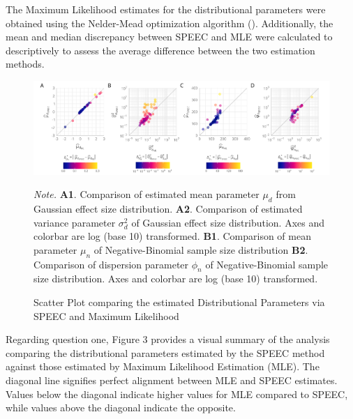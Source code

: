 \documentclass[
  12pt,
]{scrartcl}
\begin{document}
The Maximum Likelihood estimates for the distributional parameters were
obtained using the Nelder-Mead optimization algorithm
().
Additionally, the mean and median discrepancy between SPEEC and MLE were
calculated to descriptively to assess the average difference between the
two estimation methods.

\begin{figure}[H]
\caption{Scatter Plot comparing the estimated Distributional Parameters via SPEEC and Maximum Likelihood\label{fig:ml-speec-comparison}}

\begin{center}
\includegraphics[width=1\textwidth,height=\textheight]{../figures/method_comparison.png}
\end{center}

\begingroup
\scriptsize
\textit{Note.} \textbf{A1}. Comparison of estimated mean parameter $\mu_d$ from Gaussian effect size distribution. \textbf{A2}. Comparison of estimated variance parameter $\sigma_d^2$ of Gaussian effect size distribution. Axes and colorbar are log (base 10) transformed. \textbf{B1}. Comparison of mean parameter $\mu_n$ of Negative-Binomial sample size distribution \textbf{B2}. Comparison of dispersion parameter $\phi_n$ of Negative-Binomial sample size distribution. Axes and colorbar are log (base 10) transformed.
\endgroup
\end{figure}

Regarding question one, Figure 3 provides a visual summary of the
analysis comparing the distributional parameters estimated by the SPEEC
method against those estimated by Maximum Likelihood Estimation (MLE).
The diagonal line signifies perfect alignment between MLE and SPEEC
estimates. Values below the diagonal indicate higher values for MLE
compared to SPEEC, while values above the diagonal indicate the
opposite.
\end{document}
